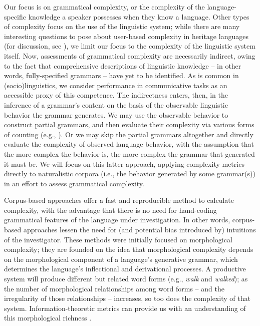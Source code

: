 \documentclass[output=paper]{langscibook}
\begin{document}
Our focus is on grammatical complexity, or the complexity of the language-specific knowledge a speaker possesses when they know a language. Other types of complexity focus on the use of the linguistic system; while there are many interesting questions to pose about user-based complexity in heritage languages (for discussion, see \citealp{lalekoscontras2021}), we limit our focus to the complexity of the linguistic system itself. Now, assessments of grammatical complexity are necessarily indirect, owing to the fact that comprehensive descriptions of linguistic knowledge -- in other words, fully-specified grammars -- have yet to be identified. As is common in (socio)linguistics, we consider performance in communicative tasks as an accessible proxy of this competence. The indirectness enters, then, in the inference of a grammar's content on the basis of the observable linguistic behavior the grammar generates. We may use the observable behavior to construct partial grammars, and then evaluate their complexity via various forms of counting (e.g., \citealp{nichols1992,bakker1998,lupyandale2010}). Or we may skip the partial grammars altogether and directly evaluate the complexity of observed language behavior, with the assumption that the more complex the behavior is, the more complex the grammar that generated it must be. We will focus on this latter approach, applying complexity metrics directly to naturalistic corpora (i.e., the behavior generated by some grammar(s)) in an effort to assess grammatical complexity.

Corpus-based approaches offer a fast and reproducible method to calculate complexity, with the advantage that there is no need for hand-coding grammatical features of the language under investigation. In other words, corpus-based approaches lessen the need for (and potential bias introduced by) intuitions of the investigator. These methods were initially focused on morphological complexity; they are founded on the idea that morphological complexity depends on the morphological component of a language's generative grammar, which determines the language's inflectional and derivational processes. A productive system will produce different but related word forms (e.g., \emph{walk} and \emph{walked}); as the number of morphological relationships among word forms -- and the irregularity of those relationships -- increases, so too does the complexity of that system. Information-theoretic metrics can provide us with an understanding of this morphological richness \citep{gutierrez2020productivity}.
\end{document}
